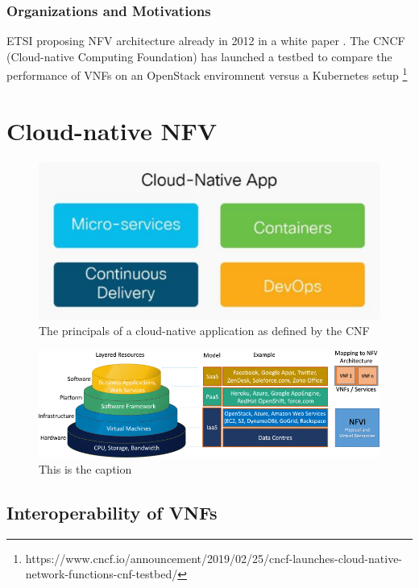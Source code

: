 \subsubsection{Organizations and Motivations}
ETSI proposing NFV architecture already in 2012 in a white paper  \cite{nfv_wp}. The CNCF (Cloud-native Computing Foundation) has launched a testbed to compare the performance of VNFs on an OpenStack enviromnent versus a Kubernetes setup \footnote{https://www.cncf.io/announcement/2019/02/25/cncf-launches-cloud-native-network-functions-cnf-testbed/}	


\section{Cloud-native NFV}

\begin{figure}
	\centering
	\includegraphics[width=0.75\linewidth]{images/cloudNativeApp.png}
	\caption{The principals of a cloud-native application as defined by the CNF \cite{CNF}}
	\label{img:cloudNativeApp}
\end{figure}

\begin{figure}
	\centering
	\includegraphics[width=1\linewidth]{images/arch.png}
	\caption{This is the caption \cite{mijumbi2016network}}
	\label{img:arch}
\end{figure}



\subsection{Interoperability of VNFs}
